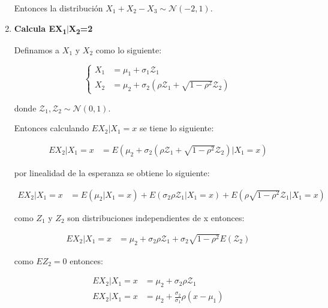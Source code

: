 \begin{enumerate}
          Entonces la distribución $X_1+X_2-X_3 \sim \mathcal{N}(-2,1)$.

    \item \textbf{Calcula EX\textsubscript{1}$|$X\textsubscript{2}=2}

          Definamos a $X_1$ y $X_2$ como lo siguiente:

          \begin{equation*}
              \begin{cases}
                  X_1 & = \mu_1 + \sigma_1 \mathcal{Z}_1                                                      \\
                  X_2 & = \mu_2 + \sigma_2 \left ( \rho \mathcal{Z}_1  + \sqrt{1-\rho^2}\mathcal{Z}_2\right )
              \end{cases}
          \end{equation*}

          donde $\mathcal{Z}_1 , \mathcal{Z}_2 \sim \mathcal{N}(0,1)$.

          Entonces calculando $EX_2|X_1=x$ se tiene lo siguiente:

          \begin{align*}
              EX_2 | X_1=x & = E(\mu_2 + \sigma_2 \left ( \rho \mathcal{Z}_1  + \sqrt{1-\rho^2}\mathcal{Z}_2\right )|X_1=x)
          \end{align*}

          por linealidad de la esperanza se obtiene lo siguiente:

          \begin{align*}
              EX_2 | X_1=x & =E(\mu_2|X_1=x) + E(\sigma_2 \rho \mathcal{Z}_1|X_1=x) + E(\rho \sqrt{1-\rho^2}\mathcal{Z}_1|X_1=x)
          \end{align*}

          como $Z_1$ y $Z_2$ son distribuciones independientes de x entonces:

          \begin{align*}
              EX_2 | X_1=x & =\mu_2 + \sigma_2 \rho \mathcal{Z}_1 + \sigma_2 \sqrt{1-\rho^2}E(\mathcal{Z}_2)
          \end{align*}

          como $EZ_2=0$ entonces:

          \begin{align*}
              EX_2 | X_1=x & =\mu_2 + \sigma_2 \rho \mathcal{Z}_1               \\
              EX_2 | X_1=x & = \mu_2 + \frac{\sigma_2}{\sigma_1} \rho (x-\mu_1)
          \end{align*}


\end{enumerate}
